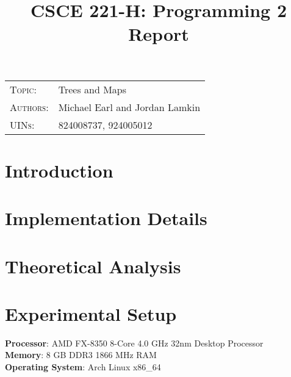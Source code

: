 \documentclass[11pt]{article}
\begin{document}



\title{CSCE 221-H: Programming 2 Report}
\maketitle

\begin{tabular}{@{} l p{16cm}}
  \textsc{Topic:}   & Trees and Maps\\
  \textsc{Authors:} & Michael Earl and Jordan Lamkin\\
  \textsc{UINs:}    & 824008737, 924005012\\
\end{tabular}


\section*{Introduction}


\section*{Implementation Details}



\section*{Theoretical Analysis}



\section*{Experimental Setup}

\textbf{Processor}: AMD FX-8350 8-Core 4.0 GHz 32nm Desktop Processor \\

\textbf{Memory}: 8 GB DDR3 1866 MHz RAM \\

\textbf{Operating System}: Arch Linux x86\_64 \\
\end{document}
